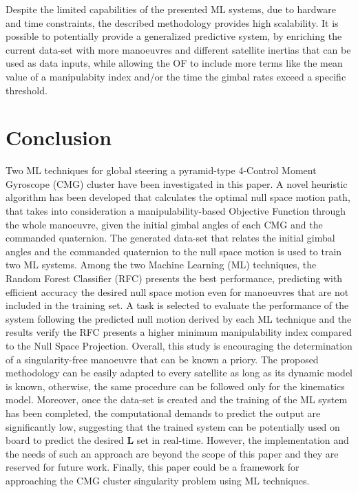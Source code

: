 \documentclass[aerospace,article,submit,moreauthors,dvi2pdf]{Definitions/mdpi}
\begin{document}
Despite the limited capabilities of the presented ML systems, due to hardware and time constraints, the described methodology provides high scalability. It is possible to potentially provide a generalized predictive system, by enriching the current data-set with more manoeuvres and different satellite inertias that can be used as data inputs, while allowing the OF to include more terms like the mean value of a manipulabity index and/or the time the gimbal rates exceed a specific threshold.
 
 
 
 
\section{Conclusion}
Two ML techniques for global steering a pyramid-type 4-Control Moment Gyroscope (CMG) cluster have been investigated in this paper. A novel heuristic algorithm has been developed that calculates the optimal null space motion path, that takes into consideration a manipulability-based Objective Function through the whole manoeuvre, given the initial gimbal angles of each CMG and the commanded quaternion. The generated data-set that relates the initial gimbal angles and the commanded quaternion to the null space motion is used to train two ML systems. Among the two Machine Learning (ML) techniques, the Random Forest Classifier (RFC) presents the best performance, predicting with efficient accuracy the desired null space motion even for manoeuvres that are not included in the training set. A task is selected to evaluate the performance of the system following the predicted null motion derived by each ML technique and the results verify the RFC presents a higher minimum manipulability index compared to the Null Space Projection.
Overall, this study is encouraging the determination of a singularity-free manoeuvre that can be known a priory. The proposed methodology can be easily adapted to every satellite as long as its dynamic model is known, otherwise, the same procedure can be followed only for the kinematics model. Moreover, once the data-set is created and the training of the ML system has been completed, the computational demands to predict the output are significantly low, suggesting that the trained system can be potentially used on board to predict the desired $\textbf{L}$ set in real-time. However, the implementation and the needs of such an approach are beyond the scope of this paper and they are reserved for future work. Finally, this paper could be a framework for approaching the CMG cluster singularity problem using ML techniques.
 
\end{document}
